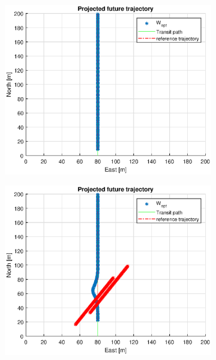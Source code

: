 \begin{figure} %
    \begin{subfigure}[b]{0.49\textwidth}
        \centering
        \includegraphics[width=\textwidth]{Images/Figures/sving_GW/Simple1_f999_Frame1}
    \end{subfigure}
    \hfill
    \begin{subfigure}[b]{0.499\textwidth}
        \centering
        \includegraphics[width=\textwidth]{Images/Figures/sving_GW/Simple1_f999_Frame2}

\end{subfigure}
\end{figure}
